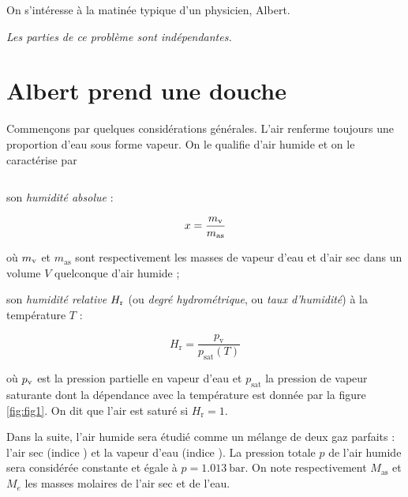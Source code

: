 \documentclass[a4paper,french,bookmarks]{article}
\begin{document}
\newboxans

On s'intéresse à la matinée typique d'un physicien, Albert.\\[-15pt]
%
\begin{center}
    \itshape Les parties de ce problème sont indépendantes.
\end{center}

\section{Albert prend une douche}

Commençons par quelques considérations générales. L'air renferme toujours une proportion d'eau sous forme vapeur. On le qualifie d'air humide et on le caractérise par
\hfill
%
\begin{minipage}{0.35\linewidth}
	\centering
	\begin{tabular}{c|c}
	\end{tabular}
\end{minipage}
%
\begin{enumerate}
	\itt son \textit{humidité absolue} :
    
    \begin{equation}
        x = \dfrac{m_\text v}{m_\text{as}}
    \end{equation}
    
    où $m_\text v$ et $m_\text{as}$ sont respectivement les masses de vapeur d'eau et d'air sec dans un volume $V$ quelconque d'air humide ;
    
    \itt son \textit{humidité relative} $H_\text r$ (ou \textit{degré hydrométrique}, ou \textit{taux d'humidité}) à la température $T$ :
    
    \begin{equation}
        H_\text{r} = \dfrac{p_\text{v}}{p_\text{sat}\left(T\right)}
    \end{equation}
    
    où $p_\text v$ est la pression partielle en vapeur d'eau et $p_\text{sat}$ la pression de vapeur saturante dont la dépendance avec la température est donnée par la figure \ref{fig:fig1}. On dit que l'air est saturé si $H_\text{r} = 1$.
\end{enumerate}

Dans la suite, l'air humide sera étudié comme un mélange de deux gaz parfaits : l'air sec (indice ) et la vapeur
d'eau (indice ). La pression totale $p$ de l'air humide sera considérée constante et égale à $p = \SI{1.013}{\bar}$.
%
On note respectivement $M_\text{as}$ et $M_e$ les masses molaires de l'air sec et de l'eau.
\end{document}
